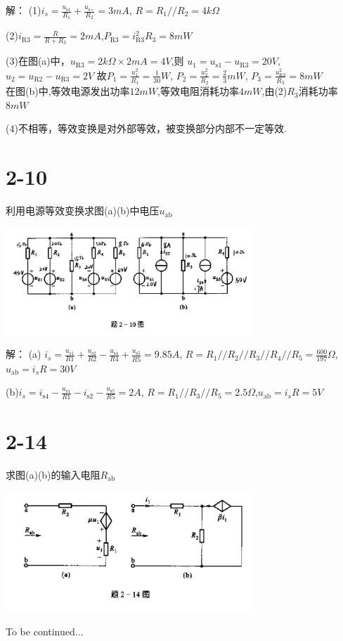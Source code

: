 \documentclass{article}
\begin{document}
\noindent 解：
(1)$i_s=\frac{u_\text{s1}}{R_1}+\frac{u_\text{s=}}{R_2}=3mA$,
$R=R_1//R_2=4k\Omega$

(2)$i_\text{R3}=\frac{R}{R+R_3}=2mA$,$P_\text{R3}=i_\text{R3}^2R_3=8mW$

(3)在图(a)中，$u_\text{R3}=2k\Omega\times2mA=4V$,则
$u_1=u_\text{s1}-u_\text{R3}=20V$,$u_2=u_\text{R2}-u_\text{R3}=2V$
故$P_1=\frac{u_1^2}{R_1}=\frac{1}{30}W$,
$P_2=\frac{u_2^2}{R_2}=\frac{2}{3}mW$,
$P_3=\frac{u_\text{R3}^2}{R_3}=8mW$\\
在图(b)中,等效电源发出功率$12mW$,等效电阻消耗功率$4mW$,由(2)$R_3$消耗功率$8mW$

(4)不相等，等效变换是对外部等效，被变换部分内部不一定等效.
\section*{2-10}
利用电源等效变换求图(a)(b)中电压$u_\text{ab}$
\begin{center}
\includegraphics[width=0.7\textwidth,height=0.2\textheight]{2-10.jpg}
\end{center}

\noindent 解：
(a)
$i_s=\frac{u_\text{s1}}{R1}+\frac{u_\text{s2}}{R2}
-\frac{u_\text{s4}}{R4}+\frac{u_\text{s5}}{R5}=9.85A$,
$R=R_1//R_2//R_3//R_4//R_5=\frac{600}{197}\Omega$,
$u_\text{ab}=i_sR=30V$

(b)$i_s=i_\text{s4}-\frac{u_\text{s1}}{R1}-i_\text{s2}-\frac{u_\text{s5}}{R5}=2A$,
$R=R_1//R_3//R_5=2.5\Omega$,$u_\text{ab}=i_sR=5V$
\section*{2-14}
求图(a)(b)的输入电阻$R_\text{ab}$
\begin{center}
\includegraphics[width=0.7\textwidth,height=0.2\textheight]{2-14.jpg}
\end{center}
To be continued...
\end{document}
